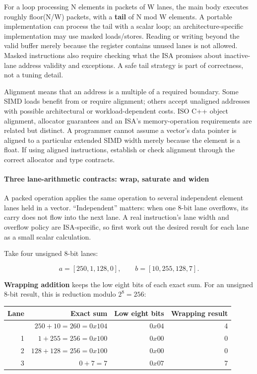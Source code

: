 For a loop processing N elements in packets of W lanes, the main body executes roughly floor(N/W) packets, with a \textbf{tail} of N mod W elements. A portable implementation can process the tail with a scalar loop; an architecture-specific implementation may use masked loads/stores. Reading or writing beyond the valid buffer merely because the register contains unused lanes is not allowed. Masked instructions also require checking what the ISA promises about inactive-lane address validity and exceptions. A safe tail strategy is part of correctness, not a tuning detail.

Alignment means that an address is a multiple of a required boundary. Some SIMD loads benefit from or require alignment; others accept unaligned addresses with possible architectural or workload-dependent costs. ISO C++ object alignment, allocator guarantees and an ISA's memory-operation requirements are related but distinct. A programmer cannot assume a vector's data pointer is aligned to a particular extended SIMD width merely because the element is a float. If using aligned instructions, establish or check alignment through the correct allocator and type contracts.

\paragraph{Three lane-arithmetic contracts: wrap, saturate and widen}\label{three-lane-arithmetic-contracts-wrap-saturate-and-widen}

A packed operation applies the same operation to several independent element lanes held in a vector. ``Independent'' matters: when one 8-bit lane overflows, its carry does not flow into the next lane. A real instruction's lane width and overflow policy are ISA-specific, so first work out the desired result for each lane as a small scalar calculation.

Take four unsigned 8-bit lanes:

\[
a=[250,1,128,0],\qquad b=[10,255,128,7].
\]

\textbf{Wrapping addition} keeps the low eight bits of each exact sum. For an unsigned 8-bit result, this is reduction modulo \(2^8=256\):

{\def\LTcaptype{none} %
\begin{longtable}[]{@{}rrrr@{}}
\toprule\noalign{}
Lane & Exact sum & Low eight bits & Wrapping result \\
\midrule\noalign{}
\endhead
\bottomrule\noalign{}
\endlastfoot
0 & \(250+10=260=0x104\) & \(0x04\) & 4 \\
1 & \(1+255=256=0x100\) & \(0x00\) & 0 \\
2 & \(128+128=256=0x100\) & \(0x00\) & 0 \\
3 & \(0+7=7\) & \(0x07\) & 7 \\
\end{longtable}
}

